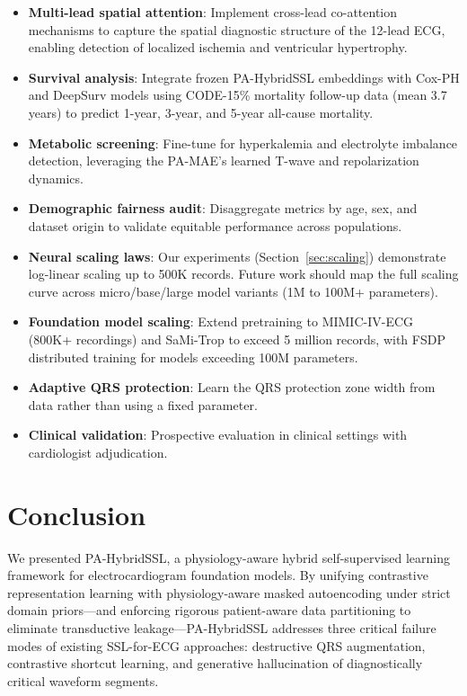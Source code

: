 \documentclass[journal,10pt]{IEEEtran}
\begin{document}
\begin{itemize}
    \item \textbf{Multi-lead spatial attention}: Implement cross-lead co-attention mechanisms to capture the spatial diagnostic structure of the 12-lead ECG, enabling detection of localized ischemia and ventricular hypertrophy.
    \item \textbf{Survival analysis}: Integrate frozen PA-HybridSSL embeddings with Cox-PH and DeepSurv models using CODE-15\% mortality follow-up data (mean 3.7 years) to predict 1-year, 3-year, and 5-year all-cause mortality.
    \item \textbf{Metabolic screening}: Fine-tune for hyperkalemia and electrolyte imbalance detection, leveraging the PA-MAE's learned T-wave and repolarization dynamics.
    \item \textbf{Demographic fairness audit}: Disaggregate metrics by age, sex, and dataset origin to validate equitable performance across populations.
    \item \textbf{Neural scaling laws}: Our experiments (Section~\ref{sec:scaling}) demonstrate log-linear scaling up to 500K records. Future work should map the full scaling curve across micro/base/large model variants (1M to 100M+ parameters).
    \item \textbf{Foundation model scaling}: Extend pretraining to MIMIC-IV-ECG (800K+ recordings) and SaMi-Trop to exceed 5 million records, with FSDP distributed training for models exceeding 100M parameters.
    \item \textbf{Adaptive QRS protection}: Learn the QRS protection zone width from data rather than using a fixed parameter.
    \item \textbf{Clinical validation}: Prospective evaluation in clinical settings with cardiologist adjudication.
\end{itemize}



\section{Conclusion}
\label{sec:conclusion}

We presented PA-HybridSSL, a physiology-aware hybrid self-supervised learning framework for electrocardiogram foundation models. By unifying contrastive representation learning with physiology-aware masked autoencoding under strict domain priors---and enforcing rigorous patient-aware data partitioning to eliminate transductive leakage---PA-HybridSSL addresses three critical failure modes of existing SSL-for-ECG approaches: destructive QRS augmentation, contrastive shortcut learning, and generative hallucination of diagnostically critical waveform segments.
\end{document}
